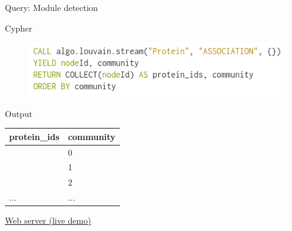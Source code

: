 \documentclass{beamer}
\begin{document}
\begin{frame}{Query: Module detection}
\begin{block}{Cypher}
\begin{figure}
    \centering
    \includegraphics[width=\linewidth]{module_detection_query.png}
\end{figure}
\end{block}
\vfill
\begin{block}{Output}
\small
\begin{tabular}{|l|l|}
    \hline
    protein\_ids & community \\ \hline \hline
    [29451,29452,29453,...] & 0 \\ \hline
    [29815,29899,30082,...] & 1 \\ \hline
    [29858] & 2 \\ \hline
    ... & ... \\
    \hline
\end{tabular}
\end{block}
\end{frame}


\begin{frame}
\centering
\href{http://localhost:5000/}{\huge{Web server (live demo)}}
\end{frame}
\end{document}
